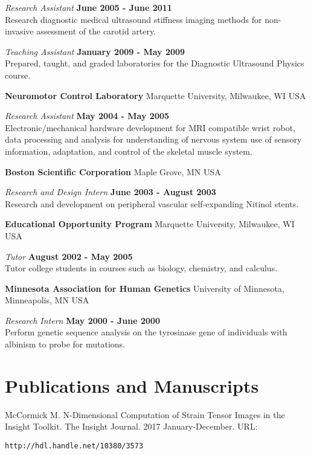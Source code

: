 \documentclass[margin,line]{res}
\begin{document}
\begin{resume}
\vspace{-.3cm}
{\em Research Assistant} \hfill {\bf June 2005 - June 2011} \\
Research diagnostic medical ultrasound stiffness imaging methods for non-invasive assessment of the carotid artery.

\vspace{-.3cm}
{\em Teaching Assistant} \hfill {\bf January 2009 - May 2009} \\
Prepared, taught, and graded laboratories for the Diagnostic Ultrasound Physics
course.

{\bf Neuromotor Control Laboratory} Marquette University, Milwaukee, WI USA

\vspace{-.3cm}
{\em Research Assistant} \hfill {\bf May 2004 - May 2005} \\
Electronic/mechanical hardware development for MRI compatible wrist robot, data processing and analysis for understanding of nervous system use of sensory information,  adaptation,  and control of the skeletal muscle system.

{\bf Boston Scientific Corporation} Maple Grove, MN USA

\vspace{-.3cm}
{\em Research and Design Intern} \hfill {\bf June 2003 - August 2003} \\
Research and development on peripheral vascular self-expanding Nitinol stents.

{\bf Educational Opportunity Program} Marquette University, Milwaukee, WI USA

\vspace{-.3cm}
{\em Tutor} \hfill {\bf August 2002 - May 2005} \\
Tutor college students in courses such as biology, chemistry, and calculus.

{\bf Minnesota Association for Human Genetics} University of Minnesota, Minneapolis, MN USA

\vspace{-.3cm}
{\em Research Intern} \hfill {\bf May 2000 - June 2000} \\
Perform genetic sequence analysis on the tyrosinase gene of individuals with albinism to probe for mutations.

\section{\sc Publications and Manuscripts}

McCormick M. N-Dimensional Computation of Strain Tensor Images in the
Insight Toolkit. The Insight Journal. 2017 January-December.
\vspace*{-.25in}
URL: \begin{verbatim}http://hdl.handle.net/10380/3573\end{verbatim}


\end{resume}
\end{document}
